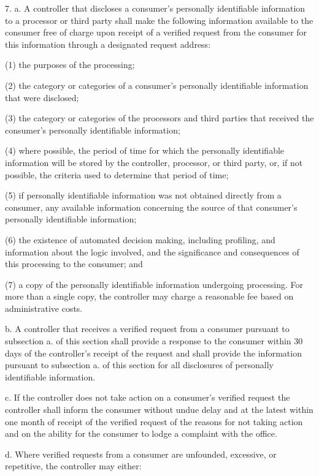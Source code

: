  

     7.    a.  A controller that discloses a consumer's personally identifiable information to a processor or third party shall make the following information available to the consumer free of charge upon receipt of a verified request from the consumer for this information through a designated request address:

     (1)   the purposes of the processing;

     (2)   the category or categories of a consumer's personally identifiable information that were disclosed;

     (3)   the category or categories of the processors and third parties that received the consumer's personally identifiable information;

     (4)   where possible, the period of time for which the personally identifiable information will be stored by the controller, processor, or third party, or, if not possible, the criteria used to determine that period of time;

     (5)   if personally identifiable information was not obtained directly from a consumer, any available information concerning the source of that consumer's personally identifiable information;

     (6)   the existence of automated decision making, including profiling, and information about the logic involved, and the significance and consequences of this processing to the consumer; and

     (7)   a copy of the personally identifiable information undergoing processing. For more than a single copy, the controller may charge a reasonable fee based on administrative costs.

     b.    A controller that receives a verified request from a consumer pursuant to subsection a. of this section shall provide a response to the consumer within 30 days of the controller's receipt of the request and shall provide the information pursuant to subsection a. of this section for all disclosures of personally identifiable information.

     c.     If the controller does not take action on a consumer's verified request the controller shall inform the consumer without undue delay and at the latest within one month of receipt of the verified request of the reasons for not taking action and on the ability for the consumer to lodge a complaint with the office.

     d.    Where verified requests from a consumer are unfounded, excessive, or repetitive, the controller may either:

